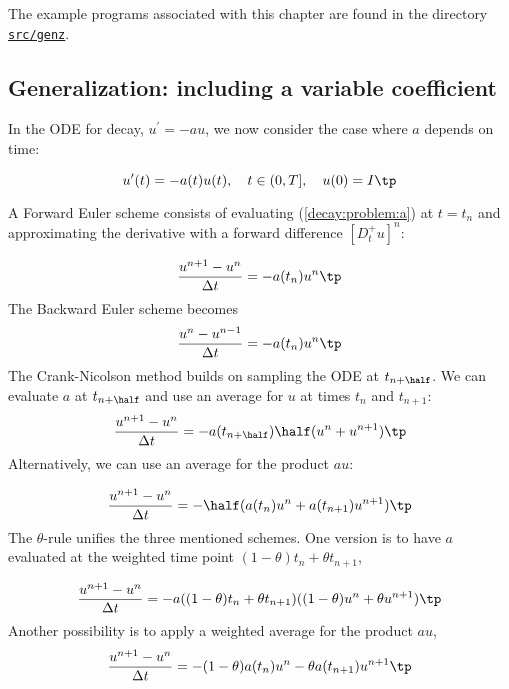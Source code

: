 \documentclass[graybox,sectrefs,envcountresetchap,open=right,final]{svmonodo}
\begin{document}
The example programs associated with this chapter are found in
the directory \href{{http://tinyurl.com/ofkw6kc/genz}}{\nolinkurl{src/genz}}.


\subsection{Generalization: including a variable coefficient}

In the ODE for decay, $u^{\prime}=-au$, we now consider the case where $a$
depends on time:

\begin{equation}
u^{\prime}(t) = -a(t)u(t),\quad t\in (0,T],\quad u(0)=I \tp
\label{decay:problem:a}
\end{equation}

A Forward Euler scheme consists of evaluating (\ref{decay:problem:a})
at $t=t_n$ and approximating the derivative with a forward
difference $[D^+_t u]^n$:

\begin{equation}
\frac{u^{n+1} - u^n}{\Delta t} = -a(t_n)u^n
\tp
\end{equation}
The Backward Euler scheme becomes
\begin{equation}
\frac{u^{n} - u^{n-1}}{\Delta t} = -a(t_n)u^n
\tp
\end{equation}
The Crank-Nicolson method builds on sampling the ODE at
$t_{n+\half}$. We can evaluate $a$ at $t_{n+\half}$
and use an average for $u$ at
times $t_n$ and $t_{n+1}$:
\begin{equation}
\frac{u^{n+1} - u^{n}}{\Delta t} = -a(t_{n+\half})\half(u^n + u^{n+1})
\tp
\end{equation}
Alternatively, we can use an average for the product $au$:

\begin{equation}
\frac{u^{n+1} - u^{n}}{\Delta t} = -\half(a(t_n)u^n + a(t_{n+1})u^{n+1})
\tp
\end{equation}
The $\theta$-rule unifies the three mentioned schemes. One version is to
have $a$ evaluated at the weighted time point $(1-\theta)t_n + \theta t_{n+1}$,

\begin{equation}
\frac{u^{n+1} - u^{n}}{\Delta t} = -a((1-\theta)t_n + \theta t_{n+1})((1-\theta) u^n + \theta u^{n+1})
\tp
\end{equation}
Another possibility is to apply a weighted average for the product $au$,
\begin{equation}
\frac{u^{n+1} - u^{n}}{\Delta t} = -(1-\theta) a(t_n)u^n - \theta
a(t_{n+1})u^{n+1}
\tp
\end{equation}
\end{document}
